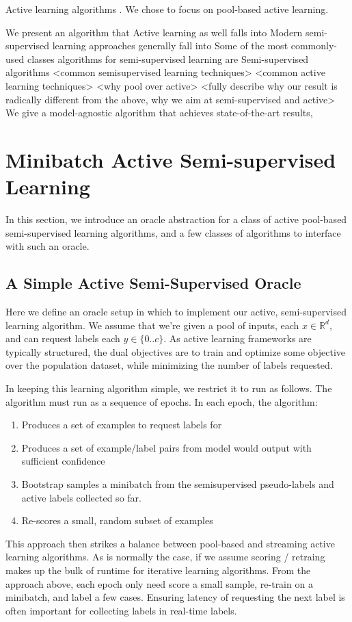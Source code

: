 \documentclass{article}
\begin{document}
Active learning algorithms .  We chose to focus on pool-based active learning.  

We present an algorithm that 
Active learning as well falls into 
Modern semi-supervised learning approaches generally fall into 
Some of the most commonly-used classes algorithms for semi-supervised learning are 
Semi-supervised algorithms
<common semisupervised learning techniques>
<common active learning techniques>  <why pool over active>
<fully describe why our result is radically different from the above, why we aim at semi-supervised and active>
We give a model-agnostic algorithm that achieves state-of-the-art results, 

\section{Minibatch Active Semi-supervised Learning}
In this section, we introduce an oracle abstraction for a class of active pool-based semi-supervised learning algorithms, and a few classes of algorithms to interface with such an oracle.  

\subsection{A Simple Active Semi-Supervised Oracle}
Here we define an oracle setup in which to implement our active, semi-supervised learning algorithm.  We assume that we're given a pool of inputs, each $x \in \mathbb{R}^{d}$, and can request labels each $y\in\{0..c\}$.  As active learning frameworks are typically structured, the dual objectives are to train and optimize some objective over the population dataset, while minimizing the number of labels requested.  

In keeping this learning algorithm simple, we restrict it to run as follows.  The algorithm must run as a sequence of epochs.  In each epoch, the algorithm:
\begin{enumerate}
\item Produces a set of examples to request labels for
\item Produces a set of example/label pairs from model would output with sufficient confidence
\item Bootstrap samples a minibatch from the semisupervised pseudo-labels and active labels collected so far.
\item Re-scores a small, random subset of examples
\end{enumerate}

This approach then strikes a balance between pool-based and streaming active learning algorithms.  As is normally the case, if we assume scoring / retraing makes up the bulk of runtime for iterative learning algorithms.  From the approach above, each epoch only need score a small sample, re-train on a minibatch, and label a few cases.  Ensuring latency of requesting the next label is often important for collecting labels in real-time labels.  
\end{document}
